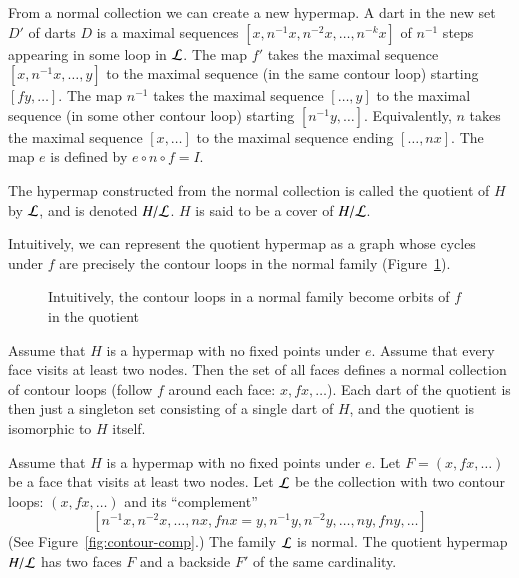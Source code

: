 From a normal collection we can create a new hypermap.   A dart in the
new set $D'$ of darts
$D$ is a maximal sequences $[x,n^{-1} x, n^{-2} x,\ldots,n^{-k} x]$
    of $n^{-1}$ steps appearing in some loop in $\cal L$.
The map $f'$ takes the maximal sequence
    $[x,n^{-1}x,\ldots,y]$ to the maximal
   sequence (in the same contour loop) starting 
    $[f y,\ldots]$.
The map $n^{-1}$ takes the maximal sequence
    $[\ldots,y]$ to the maximal sequence (in some other contour loop)
starting $[n^{-1}y,\ldots]$. Equivalently, $n$ takes the maximal sequence
$[x,\ldots]$ to the maximal sequence ending $[\ldots,n x]$. The map $e$ is
defined by $e\circ n\circ f = I$.  

\begin{definition}  The hypermap constructed from the normal collection
is called the quotient of $H$ by $\cal L$, and is denoted $H/{\cal
L}$.  $H$ is said to be a cover of $H/{\cal L}$.
\end{definition}

Intuitively, we can represent the quotient hypermap as a graph whose
cycles under $f$ 
are precisely the contour loops in the normal family (Figure~\ref{fig:quot}).

\begin{figure}[htb]
  \centering
  \caption{Intuitively, 
   the contour loops in a normal family become orbits of $f$ in the
   quotient}
  \label{fig:quot}
\end{figure}


\begin{example}\label{ex:Hall} 
Assume that $H$ is a hypermap with no fixed points under $e$.
Assume that every face visits at least two nodes.
Then the set of all faces
defines a normal collection of contour loops (follow $f$ around each face:
$x,f x,\ldots$).  Each dart of the quotient is then just a singleton
set consisting of a single dart of $H$, and the quotient is
isomorphic to $H$ itself.
\end{example}

\begin{example}\label{ex:H2} 
Assume that $H$ is a hypermap with no fixed points
under $e$.  Let $F = (x,f x,\ldots)$ be a face that visits at least two nodes.  
Let $\cal L$ be the
collection with two contour loops:  $(x,f x,\ldots)$ and its
``complement''
$$[n^{-1} x,
n^{-2} x,\ldots,n x,f n x = y,n^{-1} y, n^{-2} y,\ldots, n y, f n
y,\ldots]
$$
(See Figure~\ref{fig:contour-comp}.) 
The family $\cal L$ is normal.
The quotient hypermap $H/{\cal L}$ has two faces $F$ and a
backside $F'$ of the same cardinality.
\end{example}


